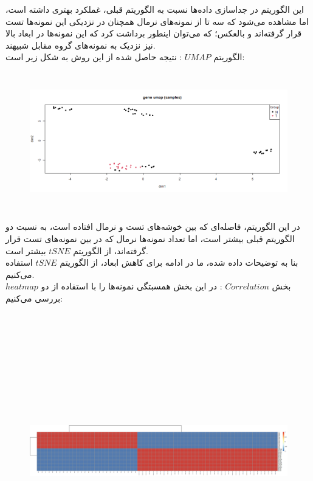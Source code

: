 \documentclass[a4paper,12pt]{article}
\begin{document}
این الگوریتم در جداسازی داده‌ها نسبت به الگوریتم قبلی، غملکرد بهتری داشته است، اما مشاهده می‌شود که سه تا از نمونه‌های نرمال همچنان در نزدیکی این نمونه‌ها تست قرار گرفته‌اند و بالعکس؛ که می‌توان اینطور برداشت کرد که این نمونه‌ها در ابعاد بالا نیز نزدیک به نمونه‌های گروه مقابل شبیهند.\\
الگوریتم $UMAP$ : نتیجه حاصل شده از این روش به شکل زیر است:
\begin{figure}[H]
 \centering
  \includegraphics[width=\linewidth , height=6cm]{../../results/umap_samples.png}
\end{figure}
در این الگوریتم، فاصله‌ای که بین خوشه‌های تست و نرمال افتاده است، به نسبت دو الگوریتم قبلی بیشتر است، اما تعداد نمونه‌ها نرمال که در بین نمونه‌های تست قرار گرفته‌اند، از الگوریتم $tSNE$ بیشتر است.\\
بنا به توضیحات داده شده، ما در ادامه برای کاهش ابعاد، از الگوریتم $tSNE$ استفاده می‌کنیم.\\
بخش
$Correlation$ :
در این بخش همسبتگی نمونه‌ها را با استفاده از دو $heatmap$ بررسی می‌کنیم:
\begin{figure}[H]
 \centering
  \includegraphics[width=\linewidth , height=12cm]{../../results/heatmap_reducted.png}
\end{figure}
\end{document}
